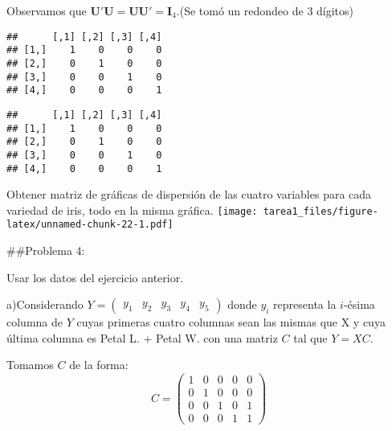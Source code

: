 \documentclass[
]{article}
\newenvironment{Shaded}{\begin{snugshade}}{\end{snugshade}}
\newcommand{\CommentTok}[1]{\textcolor[rgb]{0.56,0.35,0.01}{\textit{#1}}}
\newcommand{\DecValTok}[1]{\textcolor[rgb]{0.00,0.00,0.81}{#1}}
\newcommand{\KeywordTok}[1]{\textcolor[rgb]{0.13,0.29,0.53}{\textbf{#1}}}
\newcommand{\NormalTok}[1]{#1}
\newcommand{\OperatorTok}[1]{\textcolor[rgb]{0.81,0.36,0.00}{\textbf{#1}}}
\begin{document}
Observamos que
\(\boldsymbol{U'U}=\boldsymbol{UU'}=\boldsymbol{I}_4\).(Se tomó un
redondeo de 3 dígitos)

\begin{Shaded}
\end{Shaded}

\begin{verbatim}
##      [,1] [,2] [,3] [,4]
## [1,]    1    0    0    0
## [2,]    0    1    0    0
## [3,]    0    0    1    0
## [4,]    0    0    0    1
\end{verbatim}

\begin{Shaded}
\end{Shaded}

\begin{verbatim}
##      [,1] [,2] [,3] [,4]
## [1,]    1    0    0    0
## [2,]    0    1    0    0
## [3,]    0    0    1    0
## [4,]    0    0    0    1
\end{verbatim}

Obtener matriz de gráficas de dispersión de las cuatro variables para
cada variedad de iris, todo en la misma gráfica.
\texttt{[image: tarea1\_files/figure-latex/unnamed-chunk-22-1.pdf]}

\#\#Problema 4:

Usar los datos del ejercicio anterior.

a)Considerando
\(Y=\begin{pmatrix}y_1 & y_2 & y_3 & y_4 & y_5\end{pmatrix}\) donde
\(y_i\) representa la \(i\)-ésima columna de \(Y\) cuyas primeras cuatro
columnas sean las mismas que X y cuya última columna es Petal L. + Petal
W. con una matriz \(C\) tal que \(Y=XC\).

Tomamos \(C\) de la forma:
\[C=\begin{pmatrix}1&0&0&0&0\\0&1&0&0&0\\0&0&1&0&1\\0&0&0&1&1\end{pmatrix}\]
\end{document}
